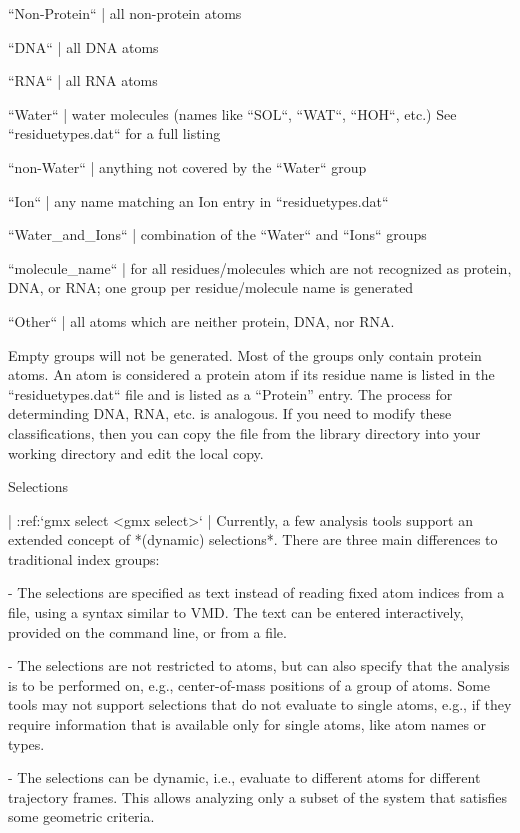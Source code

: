 ``Non-Protein``
    | all non-protein atoms

``DNA``
    | all DNA atoms

``RNA``
    | all RNA atoms

``Water``
    | water molecules (names like ``SOL``,
      ``WAT``, ``HOH``, etc.) See
      ``residuetypes.dat``
      for a full listing

``non-Water``
    | anything not covered by the ``Water`` group

``Ion``
    | any name matching an Ion entry in
      ``residuetypes.dat``

``Water_and_Ions``
    | combination of the ``Water`` and ``Ions``
      groups

``molecule_name``
    | for all residues/molecules which are not recognized as protein,
      DNA, or RNA; one group per residue/molecule name is generated

``Other``
    | all atoms which are neither protein, DNA, nor RNA.

Empty groups will not be generated. Most of the groups only contain
protein atoms. An atom is considered a protein atom if its residue name
is listed in the
``residuetypes.dat``
file and is listed as a “Protein” entry. The process for determinding
DNA, RNA, etc. is analogous. If you need to modify these
classifications, then you can copy the file from the library directory
into your working directory and edit the local copy.

Selections
~~~~~~~~~~

| :ref:`gmx select <gmx select>`
| Currently, a few analysis tools support an extended concept of
  *(dynamic) selections*. There are three
  main differences to traditional index groups:

-  The selections are specified as text instead of reading fixed atom
   indices from a file, using a syntax similar to VMD. The text can be
   entered interactively, provided on the command line, or from a file.

-  The selections are not restricted to atoms, but can also specify that
   the analysis is to be performed on, e.g., center-of-mass positions of
   a group of atoms. Some tools may not support selections that do not
   evaluate to single atoms, e.g., if they require information that is
   available only for single atoms, like atom names or types.

-  The selections can be dynamic, i.e., evaluate to different atoms for
   different trajectory frames. This allows analyzing only a subset of
   the system that satisfies some geometric criteria.

